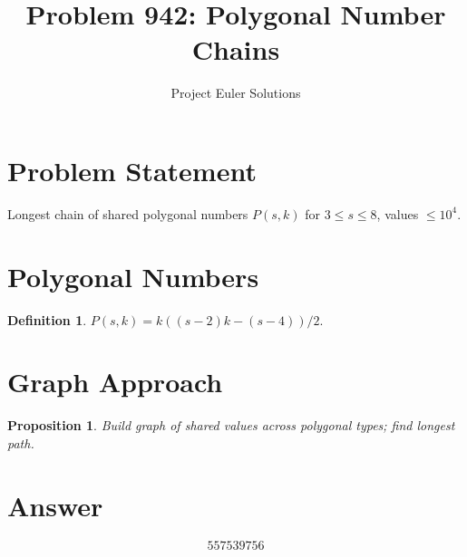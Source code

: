 \documentclass[11pt]{article}
\title{Problem 942: Polygonal Number Chains}
\author{Project Euler Solutions}
\date{}
\newtheorem{proposition}[theorem]{Proposition}
\theoremstyle{definition}
\newtheorem{definition}[theorem]{Definition}
\begin{document}
\maketitle

\section{Problem Statement}
Longest chain of shared polygonal numbers $P(s,k)$ for $3 \leq s \leq 8$, values $\leq 10^4$.

\section{Polygonal Numbers}
\begin{definition}
$P(s,k) = k((s-2)k-(s-4))/2$.
\end{definition}

\section{Graph Approach}
\begin{proposition}
Build graph of shared values across polygonal types; find longest path.
\end{proposition}

\section{Answer}

\[
\boxed{557539756}
\]
\end{document}
